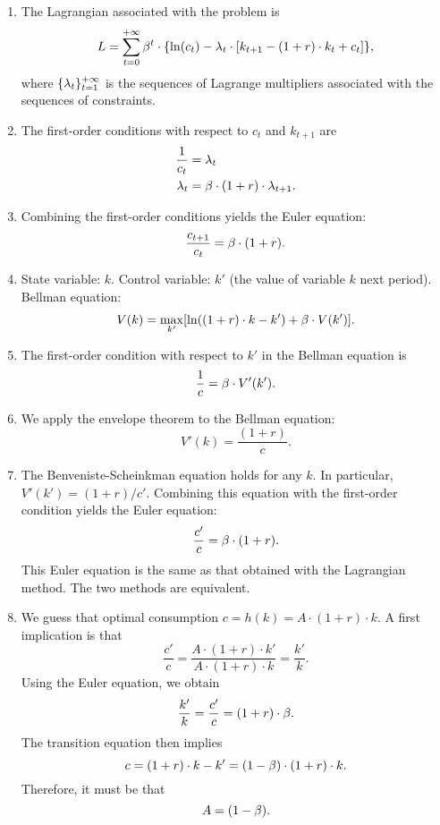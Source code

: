 \documentclass[letterpaper,12pt,leqno]{article}
\begin{document}
\begin{enumerate}
\item The Lagrangian associated with the problem is
\begin{align*}
L=\sum_{t=0}^{+\infty}\b^t \cdot\{\ln(c_t)-\l_{t}\cdot [k_{t+1}-(1+r)\cdot k_{t}+c_{t}]\},
\end{align*}
where  $\{\lambda_t\}_{t=1}^{+\infty}$ is the sequences of Lagrange multipliers associated with the sequences of constraints.

\item The first-order conditions with respect to $c_{t}$ and $k_{t+1}$ are
\begin{align*}
\frac{1}{c_{t}}&= \lambda_{t}\\
\lambda_{t}&= \beta\cdot(1+r)\cdot\lambda_{t+1}.
\end{align*}

\item Combining the first-order conditions yields the Euler equation:
\[\frac{c_{t+1}}{c_{t}}=\beta\cdot (1+r).\]

\item State variable: $k$. Control variable: $k'$ (the value of variable $k$ next period). Bellman equation:
\[V(k)=\max_{k'} [\ln((1+r)\cdot k-k')+\b\cdot V(k')].\]

\item  The first-order condition with respect to $k'$ in the Bellman equation is
\[\frac{1}{c}=\beta\cdot V'(k').\]

\item We apply the envelope theorem to the Bellman equation:
\[V'(k)=\frac{(1+r)}{c}.\]

\item The Benveniste-Scheinkman equation holds for any $k$. In particular, $V'(k')=(1+r)/c'$. Combining this equation with the first-order condition yields the Euler equation:
\[\frac{c'}{c}=\beta\cdot (1+r).\]
This Euler equation is the same as that obtained with the Lagrangian method. The two methods are equivalent.

\item We guess that optimal consumption $c=h(k)=A\cdot (1+r)\cdot k$. A first implication is that
\[\frac{c'}{c}=\frac{A\cdot (1+r)\cdot k'}{A\cdot (1+r)\cdot k}=\frac{k'}{k}.\]
Using the Euler equation, we obtain
\[\frac{k'}{k}= \frac{c'}{c}=(1+r)\cdot \beta.\]
The transition equation then implies \[c=(1+r)\cdot k-k'=(1-\beta)\cdot (1+r)\cdot k.\] Therefore, it must be that \[A=(1-\beta).\] 


\end{enumerate}
\end{document}
